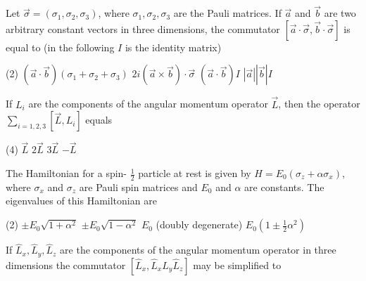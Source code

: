 \begin{enumerate}
\begin{tasks}
\end{tasks}
\begin{minipage}{\textwidth}
	\item Let $\vec{\sigma}=\left(\sigma_{1}, \sigma_{2}, \sigma_{3}\right)$, where $\sigma_{1}, \sigma_{2}, \sigma_{3}$ are the Pauli matrices. If $\vec{a}$ and $\vec{b}$ are two arbitrary constant vectors in three dimensions, the commutator $[\vec{a} \cdot \vec{\sigma}, \vec{b} \cdot \vec{\sigma}]$ is equal to (in the following $I$ is the identity matrix)
\end{minipage}
\begin{tasks}(2)
	\task[\textbf{A.}] $(\vec{a} \cdot \vec{b})\left(\sigma_{1}+\sigma_{2}+\sigma_{3}\right)$
	\task[\textbf{B.}]$2 i(\vec{a} \times \vec{b}) \cdot \vec{\sigma}$
	\task[\textbf{C.}]$(\vec{a} \cdot \vec{b}) I$
	\task[\textbf{D.}]$|\vec{a}||\vec{b}| I$
\end{tasks}
\begin{minipage}{\textwidth}
	\item If $L_{i}$ are the components of the angular momentum operator $\vec{L}$, then the operator $\sum_{i=1,2,3}\left[\vec{L}, L_{i}\right]$ equals
\end{minipage}
\begin{tasks}(4)
	\task[\textbf{A.}] $\vec{L}$
	\task[\textbf{B.}]$2 \vec{L}$
	\task[\textbf{C.}]$3 \vec{L}$
	\task[\textbf{D.}]$-\vec{L}$
\end{tasks}
\begin{minipage}{\textwidth}
	\item The Hamiltonian for a spin- $\frac{1}{2}$ particle at rest is given by $H=E_{0}\left(\sigma_{z}+\alpha \sigma_{x}\right)$, where $\sigma_{x}$ and $\sigma_{z}$ are Pauli spin matrices and $E_{0}$ and $\alpha$ are constants. The eigenvalues of this Hamiltonian are
\end{minipage}
\begin{tasks}(2)
	\task[\textbf{A.}] $\pm E_{0} \sqrt{1+\alpha^{2}}$
	\task[\textbf{B.}]$\pm E_{0} \sqrt{1-\alpha^{2}}$
	\task[\textbf{C.}]$E_{0}$ (doubly degenerate)
	\task[\textbf{D.}]$E_{0}\left(1 \pm \frac{1}{2} \alpha^{2}\right)$
\end{tasks}
\begin{minipage}{\textwidth}
	\item If $\hat{L}_{x}, \hat{L}_{y}, \hat{L}_{z}$ are the components of the angular momentum operator in three dimensions the commutator $\left[\hat{L}_{x}, \hat{L}_{x} \hat{L}_{y} \hat{L}_{z}\right]$ may be simplified to

\end{minipage}
\end{enumerate}
